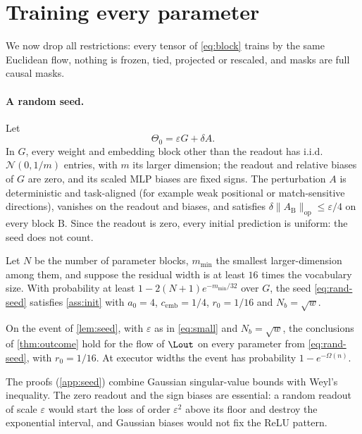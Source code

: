 \section{Training every parameter}\label{sec:full}
We now drop all restrictions: every tensor of \cref{eq:block} trains by the same Euclidean flow, nothing is frozen, tied, projected or rescaled, and masks are full causal masks.

\paragraph{A random seed.} Let
\begin{equation}\label{eq:rand-seed}
\Theta_0=\varepsilon G+\delta A .
\end{equation}
In $G$, every weight and embedding block other than the readout has i.i.d.\ $\mathcal N(0,1/m)$ entries, with $m$ its larger dimension; the readout and relative biases of $G$ are zero, and its scaled MLP biases are fixed signs. The perturbation $A$ is deterministic and task-aligned (for example weak positional or match-sensitive directions), vanishes on the readout and biases, and satisfies $\delta\|A_{\mathrm B}\|_{\mathrm{op}}\le\varepsilon/4$ on every block $\mathrm B$. Since the readout is zero, every initial prediction is uniform: the seed does not count.

\begin{lemma}\label{lem:seed}
Let $N$ be the number of parameter blocks, $m_{\min}$ the smallest larger-dimension among them, and suppose the residual width is at least $16$ times the vocabulary size. With probability at least $1-2(N+1)e^{-m_{\min}/32}$ over $G$, the seed \cref{eq:rand-seed} satisfies \cref{ass:init} with $a_0=4$, $c_{\mathrm{emb}}=1/4$, $r_0=1/16$ and $N_b=\sqrt w$.
\end{lemma}

\begin{proposition}\label{prop:random-plateau}
On the event of \cref{lem:seed}, with $\varepsilon$ as in \cref{eq:small} and $N_b=\sqrt w$, the conclusions of \cref{thm:outcome} hold for the flow of $\Lout$ on every parameter from \cref{eq:rand-seed}, with $r_0=1/16$. At executor widths the event has probability $1-e^{-\Omega(n)}$.
\end{proposition}
The proofs (\cref{app:seed}) combine Gaussian singular-value bounds \citep[Chapter~7]{vershynin2018high} with Weyl's inequality. The zero readout and the sign biases are essential: a random readout of scale $\varepsilon$ would start the loss of order $\varepsilon^2$ above its floor and destroy the exponential interval, and Gaussian biases would not fix the ReLU pattern.

